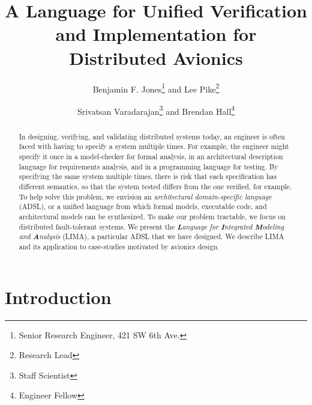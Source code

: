 \documentclass{AIAA_REVTeX41/AIAA}
\newcommand{\lee}[1]{ } %
\newcommand{\lee}[1]{ {\color{blue}$<$lee: #1$>$} } %
\begin{document}
\title{A Language for Unified Verification and Implementation for Distributed Avionics}

\author{Benjamin F. Jones\footnote{Senior Research Engineer, 421 SW 6th Ave.} and Lee Pike\footnote{Research Lead}}
\author{Srivatsan Varadarajan\footnote{Staff Scientist} and Brendan Hall\footnote{Engineer Fellow}} 

\begin{abstract}
In designing, verifying, and validating distributed systems today, an engineer is often faced with having to specify a system multiple times. For example, the engineer might specify it once in a model-checker for formal analysis, in an architectural description language for requirements analysis, and in a programming language for testing. By specifying the same system multiple times, there is risk that each specification has different semantics, so that the system tested differs from the one verified, for example. To help solve this problem, we envision an \emph{architectural domain-specific language} (ADSL), or a unified language from which formal models, executable code, and architectural models can be synthesized. To make our problem tractable, we focus on distributed fault-tolerant systems. We present the \emph{\textbf{L}anguage for \textbf{I}ntegrated \textbf{M}odeling and \textbf{A}nalysis} (LIMA), a particular ADSL that we have designed. We describe LIMA and its application to case-studies motivated by avionics design.
\end{abstract}

\maketitle

\lee{%
TODOs:
\begin{itemize}
\item Change pounds to dollars in LIMA examples.
\end{itemize}
}

\section{Introduction}
\label{sec:problem}


\end{document}
